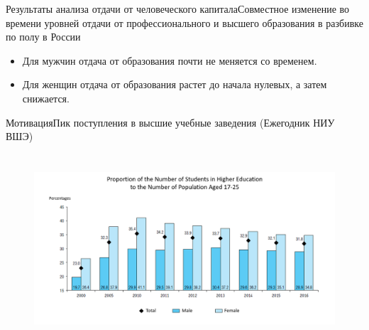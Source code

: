 \documentclass{beamer}
\begin{document}
\begin{frame}{Результаты анализа отдачи от человеческого капитала}{Совместное изменение во времени уровней отдачи от профессионального и высшего образования в разбивке по полу  в России}
	\begin{figure}
		\centering
		\hfill
	\end{figure}
\fontsize{8}{10}\selectfont
	\begin{itemize}
		\vspace*{-0.2in}
		\item Для мужчин отдача от образования почти не меняется со временем.
		\item Для женщин отдача от образования растет до начала нулевых, а затем снижается.
	\end{itemize}
\end{frame}



\begin{frame}{Мотивация}{Пик поступления в высшие учебные заведения (Ежегодник НИУ ВШЭ)}
\begin{figure}
	\centering
	\vspace*{-0.2in}
	\hspace*{-0.3in}
	\includegraphics[width=350pt, height=200pt]{graph_1b.png}
\end{figure}
\end{frame}
	
\end{document}
